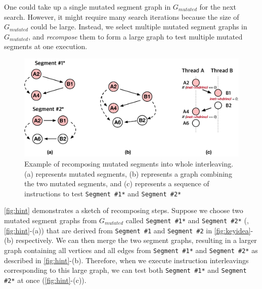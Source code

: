 %
One could take up a single mutated segment graph in $G_{mutated}$ for
the next search.
%
However, it might require many search iterations because the size of
$G_{mutated}$ could be large.
%
Instead, we select multiple mutated segment graphs in $G_{mutated}$,
and \textit{recompose} them to form a large graph to test multiple
mutated segments at one execution.
%


\begin{figure}[t]
  \centering
  \includegraphics[width=0.85\linewidth]{fig/hint.pdf}
  \caption{Example of recomposing mutated segments into whole
    interleaving. (a) represents mutated segments, (b) represents a
    graph combining the two mutated segments, and (c) represents a
    sequence of instructions to test \texttt{Segment \#1*} and
    \texttt{Segment \#2*}}
  \label{fig:hint}
\end{figure}


\autoref{fig:hint} demonstrates a sketch of recomposing steps. Suppose
we choose two mutated segment graphs from $G_{mutated}$ called
\texttt{Segment \#1*} and \texttt{Segment \#2*} (\ie,
\autoref{fig:hint}-(a)) that are derived from \texttt{Segment \#1} and
\texttt{Segment \#2} in \autoref{fig:keyidea}-(b) respectively.
%
We can then merge the two segment graphs, resulting in a
larger graph containing all vertices and all edges from \texttt{Segment
  \#1*} and \texttt{Segment \#2*} as described in
\autoref{fig:hint}-(b).
%
%
%
%
%
Therefore, when we execute instruction interleavings corresponding to this
large graph, we can test both \texttt{Segment \#1*} and \texttt{Segment
  \#2*} at once (\autoref{fig:hint}-(c)).

